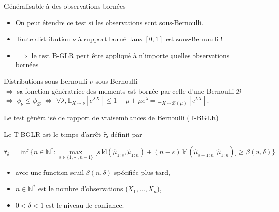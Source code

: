 \documentclass[11pt,french,ignorenonframetext,]{beamer}
\providecommand{\tightlist}{%
  \setlength{\itemsep}{0pt}\setlength{\parskip}{0pt}}
\begin{document}
\begin{frame}{Généralisable à des observations bornées \dCooley{}}

  \begin{itemize}
    \item
    On peut étendre ce test si les observations sont \alert{sous-Bernoulli}.
    \item
    Toute distribution $\nu$ à support borné dans $[0,1]$ est sous-Bernoulli !
    \item
    $\implies$ le test B-GLR peut être appliqué à n'importe quelles observations bornées \dCooley{}
  \end{itemize}

  \begin{small}
  \begin{exampleblock}{Distributions sous-Bernoulli}
    $\nu$ sous-Bernoulli \\
    $\Leftrightarrow$
    sa fonction génératrice des moments est bornée par celle d'une Bernoulli $\mathcal{B}$ \\
    $\Leftrightarrow$
    $\phi_{\nu} \leq \phi_{\mathcal{B}}$
    $\Leftrightarrow$
    $\forall \lambda, \mathbb{E}_{X\sim\nu}\left[e^{\lambda X}\right] \leq  1-\mu + \mu e^\lambda = \mathbb{E}_{X\sim \mathcal{B}(\mu)} [e^{\lambda X}]$.
  \end{exampleblock}
\end{small}

\end{frame}

\begin{frame}{Le test généralisé de rapport de vraisemblances de Bernoulli (T-BGLR)}

    Le \alert{T-BGLR} est le temps d'arrêt $\widehat{\tau}_{\delta}$ définit par
    \begin{small}
    \[ \widehat{\tau}_{\delta} = \inf \bigl\{ n \in \mathbb{N}^* : \max_{s \in \{1,\cdots,n-1\}} \bigl[s \, \mathrm{kl}\left(\widehat{\mu}_{1:s},\widehat{\mu}_{1:n}\right) + (n-s) \, \mathrm{kl}\left(\widehat{\mu}_{s+1:n},\widehat{\mu}_{1:n}\right)\bigr] \geq \beta(n,\delta) \bigr\} \]
    \vspace*{-10pt}
    \end{small}%
    \begin{itemize}\tightlist
      \item avec une \alert{function seuil} $\beta(n,\delta)$ spécifiée plus tard,
      \item $n \in \mathbb{N}^*$ est le nombre d'observations ($X_1,\dots,X_n$),
      \item $0 < \delta < 1$ est le niveau de confiance.
    \end{itemize}%

\end{frame}
\end{document}

